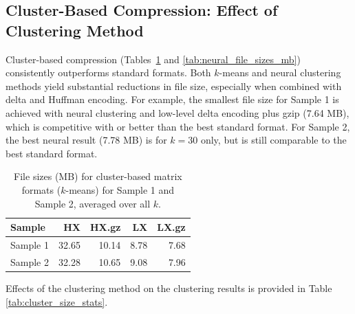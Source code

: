 \documentclass[unnumsec,webpdf,contemporary,large]{oup-authoring-template}
\begin{document}
\subsection{Cluster-Based Compression: Effect of Clustering Method}
Cluster-based compression (Tables~\ref{tab:kmeans_file_sizes_mb} and \ref{tab:neural_file_sizes_mb}) consistently outperforms standard formats. Both $k$-means and neural clustering methods yield substantial reductions in file size, especially when combined with delta and Huffman encoding. For example, the smallest file size for Sample 1 is achieved with neural clustering and low-level delta encoding plus gzip (7.64 MB), which is competitive with or better than the best standard format. For Sample 2, the best neural result (7.78 MB) is for $k=30$ only, but is still comparable to the best standard format.

\begin{table}[h!]
\centering
\caption{File sizes (MB) for cluster-based matrix formats ($k$-means) for Sample 1 and Sample 2, averaged over all $k$.}
\begin{tabular}{lrrrr}
\hline
Sample & HX & HX.gz & LX & LX.gz \\
\hline
Sample 1 & 32.65 & 10.14 & 8.78 & 7.68 \\
Sample 2 & 32.28 & 10.65 & 9.08 & 7.96 \\
\hline
\end{tabular}
\label{tab:kmeans_file_sizes_mb}
\end{table}

Effects of the clustering method on the clustering results is provided in Table \ref{tab:cluster_size_stats}.
\end{document}
